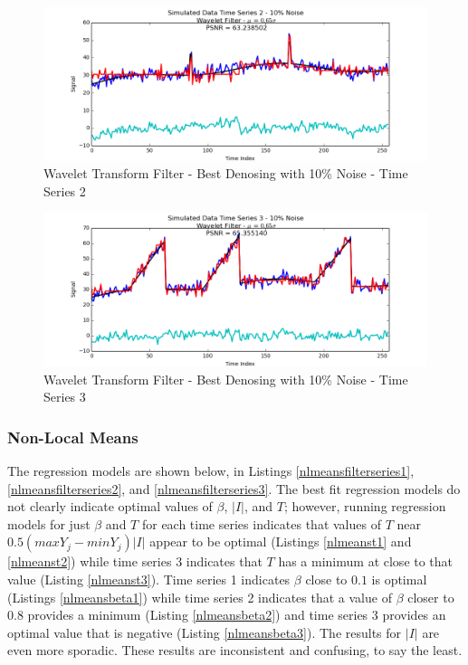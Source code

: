 \documentclass[11pt]{article}
\theoremstyle{definition}
\begin{document}
\begin{figure}
\centering
\includegraphics[width = 0.75 \textwidth]{WaveletSignal2Best.png}
\caption{Wavelet Transform Filter - Best Denosing with 10\% Noise - Time Series 2}
\label{wavelet2best}
\end{figure}

\begin{figure}
\centering
\includegraphics[width = 0.75 \textwidth]{WaveletSignal3Best.png}
\caption{Wavelet Transform Filter - Best Denosing with 10\% Noise - Time Series 3}
\label{wavelet3best}
\end{figure}

\newpage

\subsubsection{Non-Local Means}

The regression models are shown below, in Listings \ref{nlmeansfilterseries1}, \ref{nlmeansfilterseries2}, and \ref{nlmeansfilterseries3}. The best fit regression models do not clearly indicate optimal values of $\beta$, $\lvert I \rvert$, and $T$; however, running regression models for just $\beta$ and $T$ for each time series indicates that values of $T$ near $ 0.5 \left( max Y_j - min Y_j \right) \lvert I \rvert$ appear to be optimal (Listings \ref{nlmeanst1} and \ref{nlmeanst2}) while time series 3 indicates that $T$ has a minimum at close to that value (Listing \ref{nlmeanst3}). Time series 1 indicates $\beta$ close to $0.1$ is optimal (Listings \ref{nlmeansbeta1}) while time series 2 indicates that a value of $\beta$ closer to $0.8$ provides a minimum (Listing \ref{nlmeansbeta2}) and time series 3 provides an optimal value that is negative (Listing \ref{nlmeansbeta3}). The results for $\lvert I \rvert$ are even more sporadic. These results are inconsistent and confusing, to say the least.\\
\end{document}
